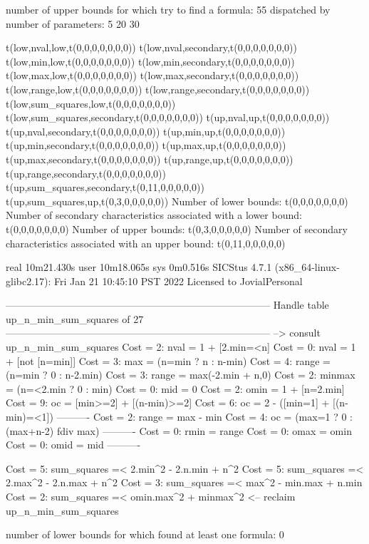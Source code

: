number of upper bounds for which try to find a formula: 55
dispatched by number of parameters: 5  20  30

t(low,nval,low,t(0,0,0,0,0,0,0))
t(low,nval,secondary,t(0,0,0,0,0,0,0))
t(low,min,low,t(0,0,0,0,0,0,0))
t(low,min,secondary,t(0,0,0,0,0,0,0))
t(low,max,low,t(0,0,0,0,0,0,0))
t(low,max,secondary,t(0,0,0,0,0,0,0))
t(low,range,low,t(0,0,0,0,0,0,0))
t(low,range,secondary,t(0,0,0,0,0,0,0))
t(low,sum_squares,low,t(0,0,0,0,0,0,0))
t(low,sum_squares,secondary,t(0,0,0,0,0,0,0))
t(up,nval,up,t(0,0,0,0,0,0,0))
t(up,nval,secondary,t(0,0,0,0,0,0,0))
t(up,min,up,t(0,0,0,0,0,0,0))
t(up,min,secondary,t(0,0,0,0,0,0,0))
t(up,max,up,t(0,0,0,0,0,0,0))
t(up,max,secondary,t(0,0,0,0,0,0,0))
t(up,range,up,t(0,0,0,0,0,0,0))
t(up,range,secondary,t(0,0,0,0,0,0,0))
t(up,sum_squares,secondary,t(0,11,0,0,0,0,0))
t(up,sum_squares,up,t(0,3,0,0,0,0,0))
Number of lower bounds:                                             t(0,0,0,0,0,0,0)
Number of secondary characteristics associated with a lower bound:  t(0,0,0,0,0,0,0)
Number of upper bounds:                                             t(0,3,0,0,0,0,0)
Number of secondary characteristics associated with an upper bound: t(0,11,0,0,0,0,0)

real	10m21.430s
user	10m18.065s
sys	0m0.516s
SICStus 4.7.1 (x86_64-linux-glibc2.17): Fri Jan 21 10:45:10 PST 2022
Licensed to JovialPersonal


--------------------------------------------------------------------------------
Handle table up_n_min_sum_squares of 27
--------------------------------------------------------------------------------
--> consult up_n_min_sum_squares
Cost =  2:  nval   = 1 + [2.min=<n]
Cost =  0:  nval   = 1 + [not [n=min]]
Cost =  3:  max    = (n=min ? n : n-min)
Cost =  4:  range  = (n=min ? 0 : n-2.min)
Cost =  3:  range  = max(-2.min + n,0)
Cost =  2:  minmax = (n=<2.min ? 0 : min)
Cost =  0:  mid    = 0
Cost =  2:  omin   = 1 + [n=2.min]
Cost =  9:  oc     = [min>=2] + [(n-min)>=2]
Cost =  6:  oc     = 2 - ([min=1] + [(n-min)=<1])
----------
Cost =  2:  range  = max - min
Cost =  4:  oc     = (max=1 ? 0 : (max+n-2) fdiv max)
----------
Cost =  0:  rmin   = range
Cost =  0:  omax   = omin
Cost =  0:  omid   = mid
----------

Cost =  5:  sum_squares =< 2.min^2 - 2.n.min + n^2
Cost =  5:  sum_squares =< 2.max^2 - 2.n.max + n^2
Cost =  3:  sum_squares =< max^2 - min.max + n.min
Cost =  2:  sum_squares =< omin.max^2 + minmax^2
<-- reclaim up_n_min_sum_squares

number of lower bounds for which found at least one formula: 0


